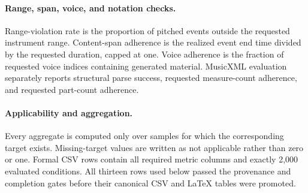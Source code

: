 \paragraph{Range, span, voice, and notation checks.}
Range-violation rate is the proportion of pitched events outside the requested instrument range. Content-span adherence is the realized event end time divided by the requested duration, capped at one. Voice adherence is the fraction of requested voice indices containing generated material. MusicXML evaluation separately reports structural parse success, requested measure-count adherence, and requested part-count adherence.

\paragraph{Applicability and aggregation.}
Every aggregate is computed only over samples for which the corresponding target exists. Missing-target values are written as not applicable rather than zero or one. Formal CSV rows contain all required metric columns and exactly 2,000 evaluated conditions. All thirteen rows used below passed the provenance and completion gates before their canonical CSV and LaTeX tables were promoted.
